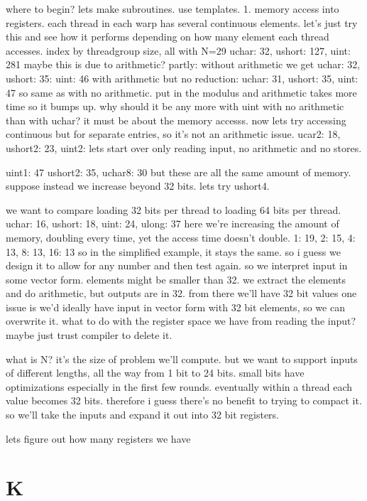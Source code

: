 where to begin? lets make subroutines. use templates.
1. memory access into registers. each thread in each warp has several continuous elements.
let's just try this and see how it performs depending on how many element each thread accesses.
    index by threadgroup size, all with N=29
        uchar: 32, ushort: 127, uint: 281
        maybe this is due to arithmetic?
        partly: without arithmetic we get
        uchar: 32, ushort: 35: uint: 46
    with arithmetic but no reduction:
        uchar: 31, ushort: 35, uint: 47
        so same as with no arithmetic. put in the modulus and arithmetic takes more time so it bumps up. 
        why should it be any more with uint with no arithmetic than with uchar? it must be about the memory accesss.
    now lets try accessing continuous but for separate entries, so it's not an arithmetic issue.
        ucar2: 18, ushort2: 23, uint2: 
lets start over only reading input, no arithmetic and no stores.

uint1: 47
ushort2: 35,
uchar8: 30
but these are all the same amount of memory. suppose instead we increase beyond 32 bits. lets try ushort4. 

we want to compare loading 32 bits per thread to loading 64 bits per thread. 
uchar: 16, ushort: 18, uint: 24, ulong: 37
here we're increasing the amount of memory, doubling every time, yet the access time doesn't double.
1: 19, 2: 15, 4: 13, 8: 13, 16: 13
so in the simplified example, it stays the same. 
so i guess we design it to allow for any number and then test again.
so we interpret input in some vector form. elements might be smaller than 32. we extract the elements and do arithmetic, but outputs are in 32. from there we'll have 32 bit values
one issue is we'd ideally have input in vector form with 32 bit elements, so we can overwrite it. what to do with the register space we have from reading the input? maybe just trust compiler to delete it. 

what is N? it's the size of problem we'll compute. but we want to support inputs of different lengths, all the way from 1 bit to 24 bits. small bits have optimizations especially in the first few rounds. 
eventually within a thread each value becomes 32 bits. therefore i guess there's no benefit to trying to compact it. so we'll take the inputs and expand it out into 32 bit registers.

lets figure out how many registers we have




\section{K}

